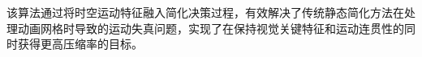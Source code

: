 该算法通过将时空运动特征融入简化决策过程，有效解决了传统静态简化方法在处理动画网格时导致的运动失真问题，实现了在保持视觉关键特征和运动连贯性的同时获得更高压缩率的目标。





        
        
    
    
    


